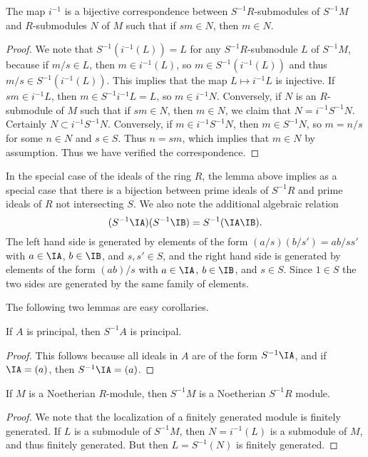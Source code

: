 \begin{lemma}
    The map $i^{-1}$ is a bijective correspondence between $S^{-1}R$-submodules of $S^{-1}M$ and $R$-submodules $N$ of $M$ such that if $sm \in N$, then $m \in N$.
\end{lemma}
\begin{proof}
    We note that $S^{-1}(i^{-1}(L)) = L$ for any $S^{-1}R$-submodule $L$ of $S^{-1}M$, because if $m/s \in L$, then $m \in i^{-1}(L)$, so $m \in S^{-1}(i^{-1}(L))$ and thus $m/s \in S^{-1}(i^{-1}(L))$. This implies that the map $L \mapsto i^{-1}L$ is injective. If $sm \in i^{-1}L$, then $m \in S^{-1}i^{-1}L = L$, so $m \in i^{-1}N$. Conversely, if $N$ is an $R$-submodule of $M$ such that if $sm \in N$, then $m \in N$, we claim that $N = i^{-1}S^{-1}N$. Certainly $N \subset i^{-1}S^{-1}N$. Conversely, if $m \in i^{-1}S^{-1}N$, then $m \in S^{-1}N$, so $m = n/s$ for some $n \in N$ and $s \in S$. Thus $n = sm$, which implies that $m \in N$ by assumption. Thus we have verified the correspondence.
\end{proof}

\begin{remark}
    In the special case of the ideals of the ring $R$, the lemma above implies as a special case that there is a bijection between prime ideals of $S^{-1}R$ and prime ideals of $R$ not intersecting $S$. We also note the additional algebraic relation
    \[ (S^{-1} \IA) (S^{-1} \IB) = S^{-1}(\IA \IB). \]
    The left hand side is generated by elements of the form $(a/s)(b/s') = ab/ss'$ with $a \in \IA$, $b \in \IB$, and $s,s' \in S$, and the right hand side is generated by elements of the form $(ab)/s$ with $a \in \IA$, $b \in \IB$, and $s \in S$. Since $1 \in S$ the two sides are generated by the same family of elements.
\end{remark}

The following two lemmas are easy corollaries.

\begin{prop}
    If $A$ is principal, then $S^{-1}A$ is principal.
\end{prop}
\begin{proof}
    This follows because all ideals in $A$ are of the form $S^{-1} \IA$, and if $\IA = (a)$, then $S^{-1}\IA = (a)$.
\end{proof}

\begin{prop}
    If $M$ is a Noetherian $R$-module, then $S^{-1}M$ is a Noetherian $S^{-1}R$ module.
\end{prop}
\begin{proof}
    We note that the localization of a finitely generated module is finitely generated. If $L$ is a submodule of $S^{-1}M$, then $N = i^{-1}(L)$ is a submodule of $M$, and thus finitely generated. But then $L = S^{-1}(N)$ is finitely generated.
\end{proof}

